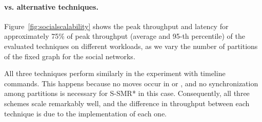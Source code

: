 

\paragraph*{\dynastar vs. alternative techniques.}
\label{sec:evaluation:results}

Figure~\ref{fig:socialscalability} shows the peak throughput and latency for approximately 75\% of peak throughput
 (average and 95-th percentile) of the evaluated techniques on different workloads, as we vary the number of 
 partitions of the fixed graph for the social networks.

All three techniques perform similarly in the experiment with timeline commands. This happens because no moves occur in
\dynastar or \dssmr{}, and no synchronization among partitions is necessary for S-SMR* in this case. 
Consequently, all three schemes scale remarkably well, and
the difference in throughput between each technique is due to the implementation of each one.



